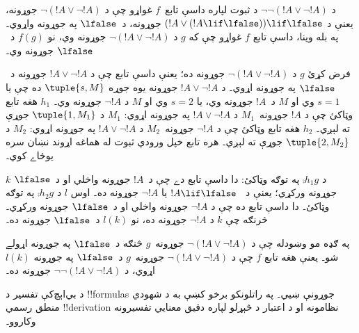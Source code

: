 \documentclass[../../../include/open-logic-section]{subfiles}
\begin{document}
\begin{ex}
د $\lnot \lnot (!A \lor \lnot !A)$ د ثبوت لپاره داسې تابع~$f$
غواړو چې د $\lnot(!A \lor \lnot !A)$ جوړونه، يعنې د $(!A
\lor (!A \lif \lfalse)) \lif \lfalse$ جوړونه، د~$\lfalse$
په جوړونه واړوي۔ په بله وينا، داسې تابع $f$ غواړو چې که $g$ د
$\lnot(!A \lor \lnot !A)$ جوړونه وي، نو $f(g)$ د~$\lfalse$
جوړونه وي۔

فرض کړئ $g$ د $\lnot(!A \lor \lnot !A)$ جوړونه ده؛ يعنې داسې
تابع چې د $!A \lor \lnot !A$ جوړونه د~$\lfalse$ په جوړونه
اړوي۔ د $!A \lor \lnot !A$ جوړونه يوه جوړه $\tuple{s, M}$ ده
چې يا $s = 1$ وي او $M$ د~$!A$ جوړونه وي، يا $s = 2$ وي او
$M$ د $\lnot !A$ جوړونه وي۔ $h_1$ هغه تابع وټاکئ چې د $!A$
جوړونه~$M_1$ د $!A \lor \lnot !A$ په جوړونه اړوي: $M_1$
د $\tuple{1, M_1}$ جوړې ته لېږي۔ $h_2$ هغه تابع وټاکئ چې د
$\lnot !A$ جوړونه~$M_2$ د $!A \lor \lnot !A$ په جوړونه
اړوي: $M_2$ د $\tuple{2, M_2}$ جوړې ته لېږي۔
هره تابع خپل ورودي ثبوت له هماغه اړوند نښان سره يوځاے کوي۔

$k$ د $\comp{h_1}{g}$ په توګه وټاکئ: دا داسې تابع دے چې د~$!A$
جوړونه واخلي او د~$\lfalse$ جوړونه ورکړي؛ يعنې د
~$!A \lif \lfalse$ يا $\lnot !A$ جوړونه ده۔ اوس $l$ د
$\comp{h_2}{g}$ په توګه وټاکئ۔ دا داسې تابع ده چې د $\lnot !A$
جوړونه واخلي او د~$\lfalse$ جوړونه ورکړي۔ څرنګه چې $k$ د
$\lnot !A$ جوړونه ده، نو $l(k)$ د~$\lfalse$ جوړونه ده۔

په ګډه مو وښودله چې د $\lnot(!A \lor \lnot !A)$ جوړونه~$g$
څنګه د~$\lfalse$ په جوړونه اړولے شو۔ يعنې هغه تابع $f$ چې د
$\lnot(!A \lor \lnot !A)$ جوړونه~$g$ د~$\lfalse$ په
جوړونه $l(k)$ اړوي، د $\lnot\lnot(!A \lor \lnot !A)$ جوړونه ده۔
\end{ex}

د بي‌اېچ‌کې تفسير د !!{formula}s جوړونې ښيي۔ په راتلونکو
برخو کښې به د شهودي منطق رسمي !!{derivation} نظامونه او د
اعتبار د څېړلو لپاره دقيق معنايي تفسيرونه وکاروو۔
\end{document}
